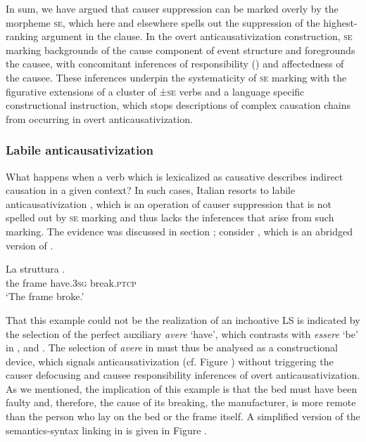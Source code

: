 \documentclass[output=paper,colorlinks,citecolor=brown
]{langscibook}
\begin{document}
In sum, we have argued that causer suppression can be marked overly by the morpheme \textsc{se}, which here and elsewhere spells out the suppression of the highest-ranking argument in the clause. In the overt anticausativization construction, \textsc{se} marking backgrounds of the cause component of event structure and foregrounds the causee, with concomitant inferences of responsibility (\cites[24 and references therein]{zribi1987reflexivite}{kailuweit2012construcciones}{martin2014anticausatives}) and affectedness \citep{lyons1969introduction} of the causee. These inferences underpin the systematicity of \textsc{se} marking with the figurative extensions of a cluster of ±\textsc{se} verbs and a language specific constructional instruction, which stops descriptions of complex causation chains from occurring in overt anticausativization. 

\subsubsection{Labile anticausativization}
\label{bentley_section_5.4.2}
What happens when a verb which is lexicalized as causative describes indirect causation in a given
context? In such cases, Italian resorts to labile anticausativization \citep{bentley2021two}, which
is an operation of causer suppression that is not spelled out by \textsc{se} marking and thus lacks
the inferences that arise from such marking. The evidence was discussed in section ; consider , which is an abridged version of . 

\ea \label{bentley_example_59}
\gll La		struttura							. \\
			the		frame				have.3\textsc{sg}	break.\textsc{ptcp}	\\
\glt 			‘The frame broke.’
\z

That this example could not be the realization of an inchoative LS is indicated by the selection of the perfect auxiliary \textit{avere} ‘have’, which contrasts with \textit{essere} ‘be’ in ,  and . The selection of \textit{avere} in  must thus be analysed as a constructional device, which signals anticausativization (cf. Figure ) without triggering the causer defocusing and causee responsibility inferences of overt anticausativization. As we mentioned, the implication of this example is that the bed must have been faulty and, therefore, the cause of its breaking, the manufacturer, is more remote than the person who lay on the bed or the frame itself. A simplified version of the semantics-syntax linking in  is given in Figure .
\end{document}
